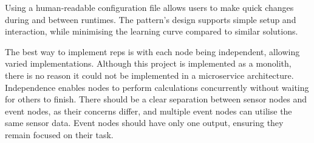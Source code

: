 		Using a human-readable configuration file allows users to make quick changes during and between runtimes. The pattern’s design supports simple setup and interaction, while minimising the learning curve compared to similar solutions.
		
		The best way to implement \gls{reps} is with each node being independent, allowing varied implementations. Although this project is implemented as a monolith, there is no reason it could not be implemented in a microservice architecture. Independence enables nodes to perform calculations concurrently without waiting for others to finish. There should be a clear separation between sensor nodes and event nodes, as their concerns differ, and multiple event nodes can utilise the same sensor data. Event nodes should have only one output, ensuring they remain focused on their task.